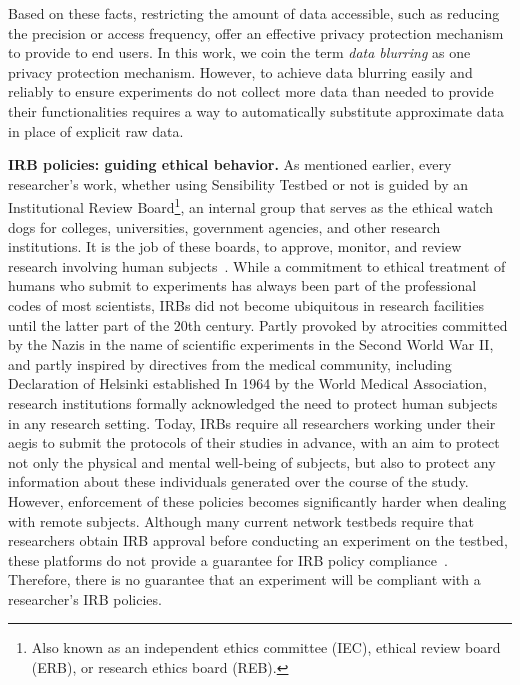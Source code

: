 Based on these facts, restricting 
the amount of data accessible, such as reducing the precision or 
access frequency, offer an effective privacy protection mechanism to 
provide to end users. In this work, we coin the term \textit{data blurring}
as one privacy protection mechanism. However, to achieve data blurring easily and reliably to 
ensure experiments do not collect more data than needed to provide 
their functionalities requires a way to automatically substitute approximate 
data in place of explicit raw data.

\textbf{IRB policies: guiding ethical behavior.}
As mentioned earlier, every researcher's work, whether using Sensibility
Testbed or not is guided by an 
Institutional Review Board\footnote{\scriptsize Also known as an 
independent ethics committee (IEC), ethical review board (ERB), 
or research ethics board (REB).}, an internal group that serves as 
the ethical watch dogs for colleges, universities, government agencies, 
and other research institutions. It is the job of these boards, 
to approve, monitor, and review research involving human 
subjects~\cite{irb}. While a commitment to ethical treatment of humans who 
submit to experiments has always been part of the professional codes of most 
scientists, IRBs did not become ubiquitous in research facilities until the 
latter part of the 20th century.  Partly provoked by atrocities committed by 
the Nazis in the name of scientific experiments in the Second World War II, 
and partly inspired by directives from the medical community, including 
Declaration of Helsinki established In 1964 by the World Medical Association, 
research institutions formally acknowledged the need to protect human subjects 
in any research setting. Today, IRBs require all researchers working under 
their aegis to submit the protocols of their studies in advance, with an aim to 
protect not only the physical and mental well-being of subjects, 
but also to protect any information about these individuals generated 
over the course of the study. However, enforcement of these policies becomes significantly harder when dealing with remote subjects. Although many current network 
testbeds require that researchers obtain IRB approval before conducting
an experiment on the testbed, these platforms do not provide a guarantee 
for IRB policy compliance~\cite{nandugudi2013phonelab, nikravesh2015mobilyzer}.
Therefore, there is no guarantee that an 
experiment will be compliant with a researcher's IRB policies. 

